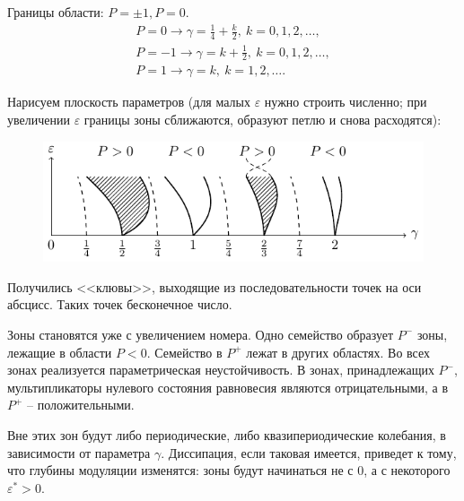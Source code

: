 Границы области: $P=\pm1, P=0$.
\begin{gather*}
	P=0 \rightarrow	\gamma=\frac14+\frac{k}2,~k=0,1,2,\dots, \\
	P=-1 \rightarrow	\gamma=k+\frac12,~k=0,1,2,\dots, \\
	P=1 \rightarrow	\gamma=k,~k=1,2,\dots.
\end{gather*}

Нарисуем плоскость параметров (для малых $\varepsilon$ нужно строить численно; при увеличении $\varepsilon$ границы зоны сближаются, образуют петлю и снова расходятся):
\begin{figure}[H]
	\centering
	\includegraphics[scale=1.5]{img/parametric_oscillations/zones}
\end{figure}

Получились <<клювы>>, выходящие из последовательности точек на оси абсцисс. Таких точек бесконечное число. 

Зоны становятся уже с увеличением номера. Одно семейство образует $P^-$ зоны, лежащие в области $P<0$. Семейство в $P^+$ лежат в других областях. Во всех зонах реализуется параметрическая неустойчивость. В зонах, принадлежащих $P^-$, мультипликаторы нулевого состояния равновесия являются отрицательными, а в $P^+$ -- положительными.  

Вне этих зон будут либо периодические, либо квазипериодические колебания, в зависимости от параметра $\gamma$. Диссипация, если таковая имеется, приведет к тому, что глубины модуляции изменятся: зоны будут начинаться не с 0, а с некоторого $\varepsilon^*>0$. 